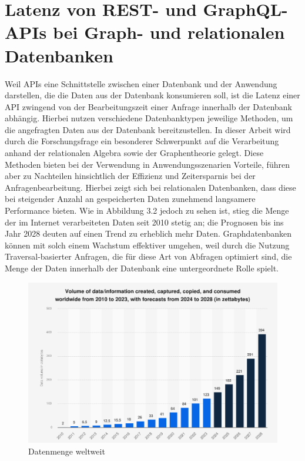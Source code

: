 \section{Latenz von REST- und GraphQL-APIs bei Graph- und relationalen Datenbanken} %
\label{sec:ff2}
Weil APIs eine Schnittstelle zwischen einer Datenbank und der Anwendung darstellen, die die Daten aus der Datenbank konsumieren soll, ist die Latenz einer API zwingend von der Bearbeitungszeit einer Anfrage innerhalb der Datenbank abhängig. Hierbei nutzen verschiedene Datenbanktypen jeweilige Methoden, um die angefragten Daten aus der Datenbank bereitzustellen. In dieser Arbeit wird durch die Forschungsfrage ein besonderer Schwerpunkt auf die Verarbeitung anhand der relationalen Algebra sowie der Graphentheorie gelegt. Diese Methoden bieten bei der Verwendung in Anwendungsszenarien Vorteile, führen aber zu Nachteilen hinsichtlich der Effizienz und Zeitersparnis bei der Anfragenbearbeitung. Hierbei zeigt sich bei relationalen Datenbanken, dass diese bei steigender Anzahl an gespeicherten Daten zunehmend langsamere Performance bieten. Wie in Abbildung 3.2 jedoch zu sehen ist, stieg die Menge der im Internet verarbeiteten Daten seit 2010 stetig an; die Prognosen bis ins Jahr 2028 deuten auf einen Trend zu erheblich mehr Daten. Graphdatenbanken können mit solch einem Wachstum effektiver umgehen, weil durch die Nutzung Traversal-basierter Anfragen, die für diese Art von Abfragen optimiert sind, die Menge der Daten innerhalb der Datenbank eine untergeordnete Rolle spielt.  \citep{9677042} \citep{performancenosql}
\begin{figure}[H]
	\centering
	\includegraphics[scale=.4]{Illustrations/growthofdata.png}
	\caption{Datenmenge weltweit \citep{statista}}
\end{figure}
